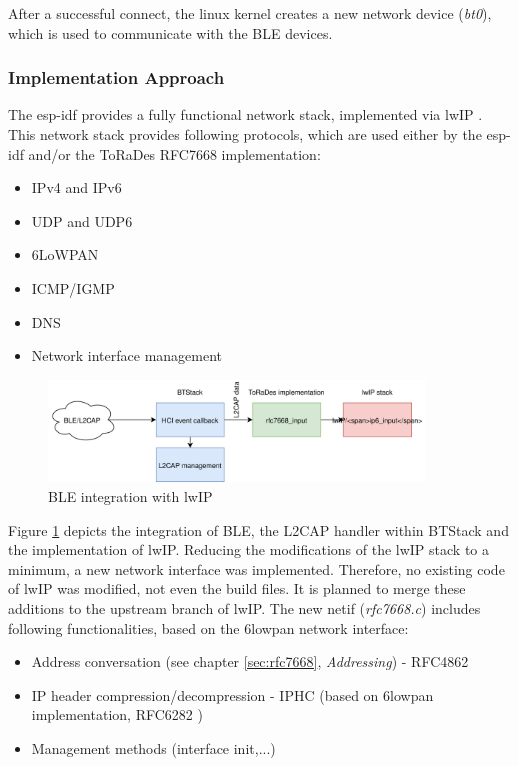 \documentclass[]{scrreprt}%
\begin{document}
After a successful connect, the linux kernel creates a new network device (\textit{bt0}), which is used to communicate with the BLE devices.


\subsubsection{Implementation Approach}

The esp-idf provides a fully functional network stack, implemented via lwIP \cite{LWIP01}. This network stack provides following protocols, which are used either
by the esp-idf and/or the ToRaDes RFC7668 implementation:

\begin{itemize}
  \item IPv4 and IPv6
  \item UDP and UDP6
  \item 6LoWPAN
  \item ICMP/IGMP
  \item DNS
  \item Network interface management
\end{itemize}

\begin{figure}[htb]
  \centering
  \label{img:ble_to_lwip}
  \includegraphics[width=100mm]{img/ble_to_lwip}
  \caption{BLE integration with lwIP}
\end{figure}

Figure \ref{img:ble_to_lwip} depicts the integration of BLE, the L2CAP handler within BTStack and the implementation of lwIP.
Reducing the modifications of the lwIP stack to a minimum, a new network interface was implemented. Therefore, no existing code of lwIP was modified, not even the build files.
It is planned to merge these additions to the upstream branch of lwIP. The new netif (\textit{rfc7668.c}) includes following functionalities, based on the 6lowpan network interface:
\begin{itemize}
 \item Address conversation (see chapter \ref{sec:rfc7668}, \textit{Addressing}) - RFC4862
 \item IP header compression/decompression - IPHC (based on 6lowpan implementation, RFC6282 \cite{RFC6282})
 \item Management methods (interface init,...)
\end{itemize}
\end{document}
